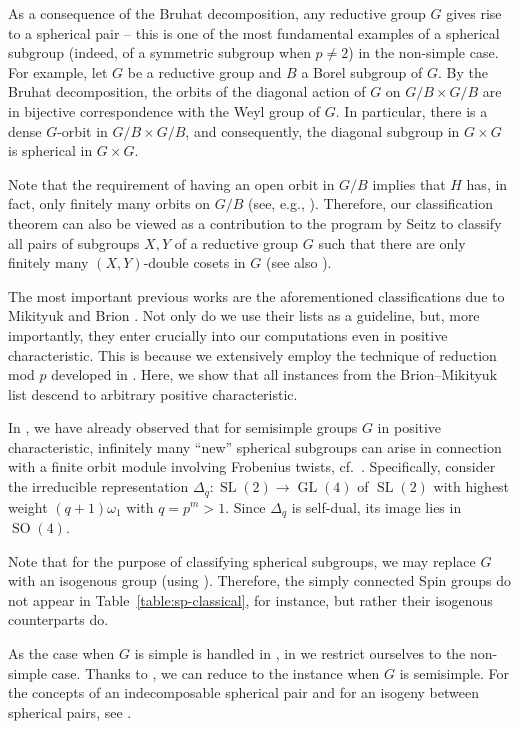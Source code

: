 \documentclass[12pt]{amsart}
\newcommand\GL{\operatorname{GL}}
\newcommand\SL{\operatorname{SL}}
\newcommand\SOO{\operatorname{SO}}
\numberwithin{equation}{section}
\theoremstyle{definition}
\begin{document}
As a consequence of the Bruhat decomposition, any reductive group $G$
gives rise to a spherical pair -- this is one of the most fundamental examples
of a spherical subgroup (indeed, of a symmetric subgroup when
$p \ne 2$) in the non-simple case.  For example, let $G$ be a
reductive group and $B$ a Borel subgroup of $G$.  By the Bruhat
decomposition, the orbits of the diagonal action of $G$ on $G/B \times G/B$
are in bijective correspondence with the Weyl group of $G$.  In
particular, there is a dense $G$-orbit in $G/B \times G/B$, and
consequently, the diagonal subgroup in $G \times G$ is spherical in
$G \times G$.

Note that the requirement of having an open orbit in $G/B$ implies
that $H$ has, in fact, only finitely many orbits on $G/B$ (see, e.g.,
\cite{Knop3}). Therefore, our classification theorem can also be
viewed as a contribution to the program by Seitz \cite{Seitz} to
classify all pairs of subgroups $X,Y$ of a reductive group $G$ such
that there are only finitely many $(X,Y)$-double cosets in $G$ (see
also \cite{Br}).

The most important previous works are the aforementioned
classifications due to Mikityuk \cite[\S 5]{mik} and Brion
\cite{Bri87}.  Not only do we use their lists as a guideline, but, more
importantly, they enter crucially into our computations even in positive
characteristic.  This is because we extensively employ the technique
of reduction mod $p$ developed in \cite{KR}.  Here, we show that all
instances from the Brion--Mikityuk list descend to arbitrary positive
characteristic.

In \cite{KR}, we have already observed that for semisimple groups $G$
in positive characteristic, infinitely many ``new'' spherical subgroups
can arise in connection with a finite orbit module involving Frobenius
twists, cf.~\cite[Lem.\ 2.6]{GLMS}.  Specifically, consider the
irreducible representation $\Delta_q:\SL(2)\to\GL(4)$ of $\SL(2)$ with
highest weight $(q+1)\omega_1$ with $q=p^m>1$.  Since $\Delta_q$ is
self-dual, its image lies in $\SOO(4)$.

Note that for the purpose of classifying spherical subgroups, we may
replace $G$ with an isogenous group (using
). Therefore, the simply connected Spin groups do
not appear in Table~\ref{table:sp-classical}, for
instance, but rather their isogenous counterparts do.

As the case when $G$ is simple is handled in \cite{KR}, in  we restrict ourselves to the non-simple case. Thanks to , we can reduce to the instance when $G$ is semisimple. For the concepts of an indecomposable spherical pair and for an isogeny between spherical pairs, see .
\end{document}
